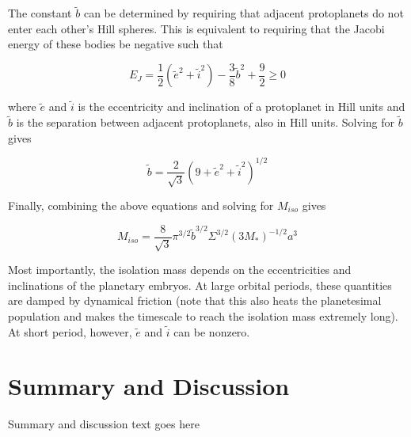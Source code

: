 \documentclass[onecolumn]{aastex63}
\begin{document}
The constant $\tilde{b}$ can be determined by requiring that adjacent protoplanets do not enter each other's Hill spheres. This is equivalent to requiring that the Jacobi energy of these bodies be negative such that \citep{Hayashi1977}

\begin{equation}
    E_{J} = \frac{1}{2} \left( \tilde{e}^{2} + \tilde{i}^{2} \right) - \frac{3}{8} \tilde{b}^{2} + \frac{9}{2}  \geq 0
\end{equation}

\noindent where $\tilde{e}$ and  $\tilde{i}$ is the eccentricity and inclination of a protoplanet in Hill units and $\tilde{b}$ is the separation between adjacent protoplanets, also in Hill units. Solving for $\tilde{b}$ gives

\begin{equation}
    \tilde{b} = \frac{2}{\sqrt{3}} \left( 9 + \tilde{e}^{2} + \tilde{i}^{2} \right)^{1/2}
\end{equation}

Finally, combining the above equations and solving for $M_{iso}$ gives

\begin{equation}
    M_{iso} = \frac{8}{\sqrt{3}} \pi^{3/2} \tilde{b}^{3/2} \Sigma^{3/2} \left( 3 M_{*} \right)^{-1/2} a^{3}
\end{equation}

Most importantly, the isolation mass depends on the eccentricities and inclinations of the planetary embryos. At large orbital periods, these quantities are damped by dynamical friction (note that this also heats the planetesimal population and makes the timescale to reach the isolation mass extremely long). At short period, however, $\tilde{e}$ and  $\tilde{i}$ can be nonzero.

\section{Summary and Discussion} \label{sec:discuss}

Summary and discussion text goes here



\clearpage
\end{document}
